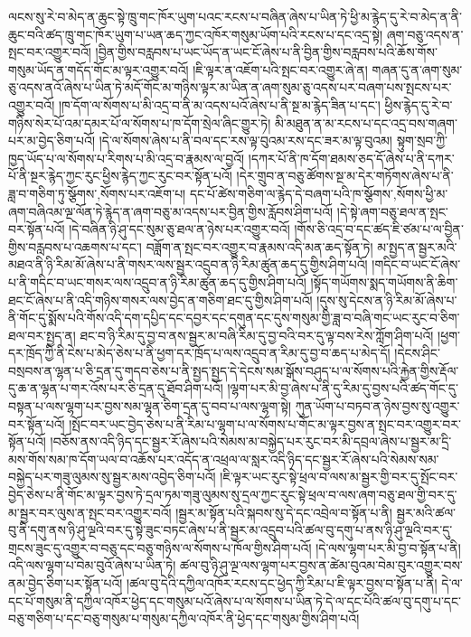 ལངས་སུ་རེ་བ་མེད་ན་ཆུང་སྟེ་ཁྲུ་གང་ཁོར་ཡུག་པའང་རངས་པ་བཞིན་ཞེས་པ་ཡིན་ཏེ་ཕྱི་མ་རྙེད་དུ་རེ་བ་མེད་ན་ནི་ཆུང་བའི་ཚད་ཁྲུ་གང་ཁོར་ཡུག་པ་ཡན་ཆད་ཀྱང་འཁོར་གསུམ་ཡོག་པའི་རངས་པ་དང་འདྲ་སྟེ། ཞག་བཅུ་འདས་ན་སྤང་བར་འགྱུར་བའོ། །བྱིན་གྱིས་བརླབས་པ་ཡང་ཡོད་ན་ཡང་ངོ་ཞེས་པ་ནི་བྱིན་གྱིས་བརླབས་པའི་ཆོས་གོས་གསུམ་ཡོད་ན་གདོད་གོང་མ་ལྟར་འགྱུར་བའོ། །ཇི་ལྟར་ན་འཇོག་པའི་སྤང་བར་འགྱུར་ཞེ་ན། གཞན་དུ་ན་ཞག་སུམ་ཅུ་འདས་ནའོ་ཞེས་པ་ཡིན་ཏེ་མདོ་གོང་མ་གཉིས་ལྟར་མ་ཡིན་ན་ཞག་སུམ་ཅུ་འདས་པར་བཞག་པས་སྤངས་པར་འགྱུར་བའོ། །ཁ་དོག་ལ་སོགས་པ་མི་འདྲ་བ་ནི་མ་འདས་པའོ་ཞེས་པ་ནི་སྔ་མ་རྙེད་ཟིན་པ་དང་། ཕྱིས་རྙེད་དུ་རེ་བ་གཉིས་སེར་པོ་འམ་དམར་པོ་ལ་སོགས་པ་ཁ་དོག་སྲེལ་ཞིང་གྱུར་ཏེ། མི་མཐུན་ན་མ་རངས་པ་དང་འདྲ་བས་གཞག་པར་མ་བྱེད་ཅིག་པའོ། །དེ་ལ་སོགས་ཞེས་པ་ནི་བལ་དང་རས་ལྟ་བུའམ་རས་དང་ཟར་མ་ལྟ་བུའམ། སྟུག་སྲབ་ཀྱི་ཁྱད་ཡོད་པ་ལ་སོགས་པ་རིགས་པ་མི་འདྲ་བ་རྣམས་ལ་བྱའོ། །དཀར་པོ་ནི་ཁ་དོག་ཐམས་ཅད་དོ་ཞེས་པ་ནི་དཀར་པོ་ནི་སྔར་རྙེད་ཀྱང་རུང་ཕྱིས་རྙེད་ཀྱང་རུང་བར་སྟོན་པའོ། །དེར་གྲུབ་ན་བཅུ་ཚོགས་སྔ་མ་དེར་གཏོགས་ཞེས་པ་ནི་ཟླ་བ་གཅིག་ཏུ་{སྩོགས་,སོགས་}པར་འཇོག་པ། དང་པོ་ཚེས་གཅིག་ལ་རྙེད་དེ་བཞག་པའི་ཁ་{སྩོགས་,སོགས་}ཕྱི་མ་ཞག་བཞིའམ་ལྔ་ལོན་ཏེ་རྙེད་ན་ཞག་བཅུ་མ་འདས་པར་བྱིན་གྱིས་རློབས་ཤིག་པའོ། །དེ་སྟེ་ཞག་བཅུ་ཐལ་ན་སྤང་བར་སྟོན་པའོ། །དེ་བཞིན་ཉི་ཤུ་དང་སུམ་ཅུ་ཐལ་ན་ཉེས་པར་འགྱུར་བའོ། །གོས་ཅི་འདྲ་བ་དང་ཚད་ཇི་ཙམ་པ་ལ་བྱིན་གྱིས་བརླབས་པ་འཆགས་པ་དང་། བཟློག་ན་སྤང་བར་འགྱུར་བ་རྣམས་འདི་མན་ཆད་སྟོན་ཏེ། མ་སྤྱད་ན་སྦྱར་མའི་མཐའ་ནི་ཉི་རིམ་མོ་ཞེས་པ་ནི་གསར་ལས་སྦྱར་འདྲུབ་ན་ཉི་རིམ་ཚུན་ཆད་དུ་གྱིས་ཤིག་པའོ། །གདིང་བ་ཡང་ངོ་ཞེས་པ་ནི་གདིང་བ་ཡང་གསར་ལས་འདྲུབ་ན་ཉི་རིམ་ཚུན་ཆད་དུ་གྱིས་ཤིག་པའོ། །སྟོད་གཡོགས་སྨད་གཡོགས་ནི་ཆིག་ཐང་ངོ་ཞེས་པ་ནི་འདི་གཉིས་གསར་ལས་བྱེད་ན་གཅིག་ཐང་དུ་གྱིས་ཤིག་པའོ། །དུས་སུ་དེངས་ན་ཉི་རིམ་མོ་ཞེས་པ་ནི་གོང་དུ་སྨོས་པའི་གོས་འདི་དག་དཔྱིད་དང་དབྱར་དང་དགུན་དང་དུས་གསུམ་གྱི་ཟླ་བ་བཞི་གང་ཡང་རུང་བ་ཅིག་ཐལ་བར་སྤྱད་ན། ཐང་བ་ཉི་རིམ་དུ་བྱ་བ་ནས་སྦྱར་མ་བཞི་རིམ་དུ་བྱ་བའི་བར་དུ་ལྟ་བས་རེས་ཀློག་ཤིག་པའོ། །ཕྱག་དར་ཁྲོད་ཀྱི་ནི་ངེས་པ་མེད་ཅེས་པ་ནི་ཕྱག་དར་ཁྲོད་པ་ལས་འདྲུབ་ན་རིམ་དུ་བྱ་བ་ཆད་པ་མེད་དོ། །དེངས་ཤིང་བསྲབས་ན་ལྷན་པ་ཅི་དྲན་དུ་གདབ་ཅེས་པ་ནི་སྤྱད་སྤྱད་དེ་དེངས་སམ་སྒོས་བཤུད་པ་ལ་སོགས་པའི་རྐྱེན་གྱིས་རྡོལ་དུ་ཆ་ན་ལྷན་པ་གར་འོས་པར་ཅི་དྲན་དུ་ཐོབ་ཤིག་པའོ། །ལྷག་པར་མི་བྱ་ཞེས་པ་ནི་དུ་རིམ་དུ་བྱས་པའི་ཚད་གོང་དུ་བསྟན་པ་ལས་ལྷག་པར་བྱས་སམ་ལྷན་ཅིག་དྲན་དུ་བབ་པ་ལས་ལྷག་སྟེ། ཀུན་ཡོག་པ་བཏབ་ན་ཉེས་བྱས་སུ་འགྱུར་བར་སྟོན་པའོ། །སྤོང་བར་ཡང་བྱེད་ཅེས་པ་ནི་རིམ་པ་ལྷག་པ་ལ་སོགས་པ་གོང་མ་ལྟར་བྱས་ན་སྤང་བར་འགྱུར་བར་སྟོན་པའོ། །བཅོས་ནས་འདི་ཉིད་དང་སྦྱར་རོ་ཞེས་པའི་སེམས་མ་བསྐྱེད་པར་རུང་བར་མི་དབྲལ་ཞེས་པ་སྦྱར་མ་དྲི་མས་གོས་སམ་ཁ་དོག་ཡལ་བ་འཆོས་པར་འདོད་ན་འཕྲལ་ལ་སླར་འདི་ཉིད་དང་སྦྱར་རོ་ཞེས་པའི་སེམས་སམ་བསྐྱེད་པར་གཟུ་ལུམས་སུ་སྦྱར་མས་འབྱེད་ཅིག་པའོ། །ཇི་ལྟར་ཡང་རུང་སྟེ་ཕྲལ་བ་ལས་མ་སྦྱར་གྱི་བར་དུ་སྤོང་བར་བྱེད་ཅེས་པ་ནི་གོང་མ་ལྟར་བྱས་ཏེ་དྲལ་ཏམ་གཟུ་ལུམས་སུ་དྲལ་ཀྱང་རུང་སྟེ་ཕྲལ་བ་ལས་ཞག་བཅུ་ཐལ་གྱི་བར་དུ་མ་སྦྱར་བར་ལུས་ན་སྤང་བར་འགྱུར་བའོ། །སྦྱར་མ་སྟོན་པའི་སྐབས་སུ་དེ་དང་འབྲེལ་བ་སྟོན་པ་ནི། སྦྱར་མའི་ཚལ་བུ་ནི་དགུ་ནས་ཉི་ཤུ་ལྔའི་བར་དུ་སྟེ་ཟུང་བཏང་ཞེས་པ་ནི་སྦྱར་མ་འདྲུབ་པའི་ཚལ་བུ་དགུ་པ་ནས་ཉི་ཤུ་ལྔའི་བར་དུ་གྲངས་ཟུང་དུ་འགྱུར་བ་བཅུ་དང་བཅུ་གཉིས་ལ་སོགས་པ་ཁོལ་གྱིས་ཤིག་པའོ། །དེ་ལས་ལྷག་པར་མི་བྱ་བ་སྟོན་པ་ནི། འདི་ལས་ལྷག་པ་བེམ་བུའོ་ཞེས་པ་ཡིན་ཏེ། ཚལ་བུ་ཉི་ཤུ་ལྔ་ལས་ལྷག་པར་བྱས་ན་ཚེམ་བུའམ་བེམ་བུར་འགྱུར་བས་ནམ་བྱེད་ཅིག་པར་སྟོན་པའོ། །ཚལ་བུ་དེའི་དཀྱིལ་འཁོར་རངས་དང་ཕྱེད་ཀྱི་རིམ་པ་ཇི་ལྟར་བྱས་བ་སྟོན་པ་ནི། དེ་ལ་དང་པོ་གསུམ་ནི་དཀྱིལ་འཁོར་ཕྱེད་དང་གསུམ་པའོ་ཞེས་པ་ལ་སོགས་པ་ཡིན་ཏེ་དེ་ལ་དང་པོའི་ཚལ་བུ་དགུ་པ་དང་བཅུ་གཅིག་པ་དང་བཅུ་གསུམ་པ་གསུམ་དཀྱིལ་འཁོར་ནི་ཕྱེད་དང་གསུམ་གྱིས་ཤིག་པའོ། 